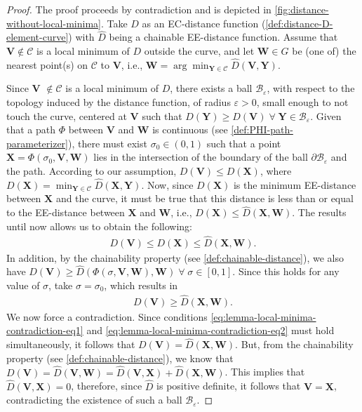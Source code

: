 \begin{proof}
    The proof proceeds by contradiction and is depicted in \cref{fig:distance-without-local-minima}. Take $D$ as an EC-distance function (\cref{def:distance-D-element-curve}) with $\widehat{D}$ being a chainable EE-distance function. Assume that $\mathbf{V}\notin\mathcal{C}$ is a local minimum of $D$ outside the curve, and let $\mathbf{W} \in G$ be (one of) the nearest point(s) on $\mathcal{C}$ to $\mathbf{V}$, i.e., $\mathbf{W}=\arg\min_{\mathbf{Y}\in\mathcal{C}}\widehat{D}(\mathbf{V}, \mathbf{Y})$.

     Since $\mathbf{V}$ $\not \in \mathcal{C}$ is a local minimum of $D$, there exists a ball $\mathcal{B}_\varepsilon$, with respect to the topology induced by the distance function, of radius $\varepsilon>0$, small enough to not touch the curve, centered at $\mathbf{V}$ such that $D(\mathbf{Y}) \ge D(\mathbf{V})\; \forall\; \mathbf{Y} \in \mathcal{B}_\varepsilon$. Given that a path $\Phi$ between $\mathbf{V}$ and $\mathbf{W}$ is continuous (see \cref{def:PHI-path-parameterizer}), there must exist $\sigma_0 \in (0,1)$ such that a point $\mathbf{X}=\Phi(\sigma_0, \mathbf{V}, \mathbf{W})$ lies in the intersection of the boundary of the ball $\partial\mathcal{B}_\varepsilon$ and the path. According to our assumption, $D(\mathbf{V}) \le D(\mathbf{X})$, where $D(\mathbf{X}) = \min_{\mathbf{Y}\in\mathcal{C}} \widehat{D}(\mathbf{X}, \mathbf{Y})$. Now, since $D(\mathbf{X})$ is the minimum EE-distance between $\mathbf{X}$ and the curve, it must be true that this distance is less than or equal to the EE-distance between $\mathbf{X}$ and $\mathbf{W}$, i.e., $D(\mathbf{X})\le \widehat{D}(\mathbf{X}, \mathbf{W})$. The results until now allows us to obtain the following:
     \begin{align}
         D(\mathbf{V}) \le D(\mathbf{X}) \le \widehat{D}(\mathbf{X}, \mathbf{W}). \label{eq:lemma-local-minima-contradiction-eq1}
     \end{align}
    In addition, by the chainability property (see \cref{def:chainable-distance}), we also have $D(\mathbf{V}) \ge \widehat{D}(\Phi(\sigma, \mathbf{V}, \mathbf{W}), \mathbf{W})\;\forall\;\sigma\in[0,1]$. Since this holds for any value of $\sigma$, take $\sigma=\sigma_0$, which results in 
    \begin{align}
        D(\mathbf{V}) \ge \widehat{D}(\mathbf{X}, \mathbf{W}). \label{eq:lemma-local-minima-contradiction-eq2}
    \end{align}
    We now force a contradiction. Since conditions \eqref{eq:lemma-local-minima-contradiction-eq1} and \eqref{eq:lemma-local-minima-contradiction-eq2} must hold simultaneously, it follows that $D(\mathbf{V}) = \widehat{D}(\mathbf{X}, \mathbf{W})$. But, from the chainability property (see \cref{def:chainable-distance}), we know that $D(\mathbf{V}) = \widehat{D}(\mathbf{V}, \mathbf{W}) = \widehat{D}(\mathbf{V}, \mathbf{X}) + \widehat{D}(\mathbf{X}, \mathbf{W})$. This implies that $\widehat{D}(\mathbf{V}, \mathbf{X})=0$, therefore, since $\widehat{D}$ is positive definite, it follows that $\mathbf{V}=\mathbf{X}$, contradicting the existence of such a ball $\mathcal{B}_\varepsilon$. 
\end{proof}

